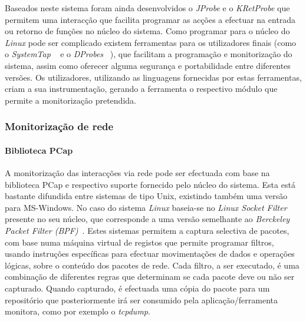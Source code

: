 \documentclass[a4paper]{llncs}
\newcommand{\td}[1]{\todo[inline]{#1}}
\begin{document}
 Baseados neste sistema foram ainda desenvolvidos o \textit{JProbe} e o \textit{KRetProbe} que permitem uma interacção que facilita programar as acções a efectuar na entrada ou retorno de funções no núcleo do sistema.
 Como programar para o núcleo do \textit{Linux} pode ser complicado existem ferramentas para os utilizadores finais (como o \textit{SystemTap} ~\cite{Jones2009} e o \textit{DProbes} ~\cite{:DProbes}),  que facilitam a programação e monitorização do sistema, assim como oferecer alguma segurança e portabilidade entre diferentes  versões. Os utilizadores, utilizando as linguagens fornecidas por estas ferramentas, criam a sua instrumentação, gerando a ferramenta o respectivo módulo que permite a monitorização pretendida.

\subsubsection{Monitorização de rede}
\label{subsub:mon_network__with_dynamic_filters_linux}

%
%
%
%

\paragraph{Biblioteca PCap\\}

A monitorização das interacções via rede pode ser efectuada com base na biblioteca PCap e respectivo suporte fornecido pelo núcleo do sistema.
 Esta está bastante difundida entre sistemas de tipo Unix, existindo também uma versão para MS-Windows.
No caso do sistema \textit{Linux} baseia-se no \textit{Linux Socket Filter} presente no seu núcleo, que corresponde a uma versão semelhante ao \textit{Berckeley Packet Filter (BPF)}~\cite{Mccanne92thebsd}.
 Estes sistemas permitem a captura selectiva de pacotes, com base numa máquina virtual de registos que permite programar filtros, usando instruções específicas para efectuar movimentações de dados e operações lógicas, sobre o conteúdo dos pacotes de rede.
 Cada filtro, a ser executado, é uma combinação de diferentes regras que determinam se cada pacote deve ou não ser capturado.
 Quando capturado, é efectuada uma cópia do pacote para um repositório que posteriormente irá ser consumido pela aplicação/ferramenta monitora, como por exemplo o \textit{tcpdump}.
\end{document}
